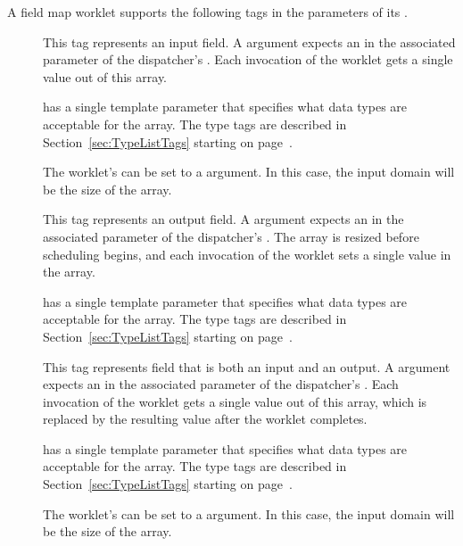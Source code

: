 A field map worklet supports the following tags in the parameters of its
\controlsignature.
\begin{description}
\item[] This tag represents an input field. A
   argument expects an  in the
  associated parameter of the dispatcher's . Each
  invocation of the worklet gets a single value out of this array.

   has a single template parameter that specifies what data
  types are acceptable for the array. The type tags are described in
  Section~\ref{sec:TypeListTags} starting on
  page~\pageref{sec:TypeListTags}.

  The worklet's  can be set to a  argument. In
  this case, the input domain will be the size of the array.

\item[] This tag represents an output field. A
   argument expects an  in the
  associated parameter of the dispatcher's . The array is
  resized before scheduling begins, and each invocation of the worklet sets
  a single value in the array.

   has a single template parameter that specifies what
  data types are acceptable for the array. The type tags are described in
  Section~\ref{sec:TypeListTags} starting on
  page~\pageref{sec:TypeListTags}.

\item[] This tag represents field that is both an input
  and an output. A  argument expects an
   in the associated parameter of the
  dispatcher's . Each invocation of the worklet gets a
  single value out of this array, which is replaced by the resulting value
  after the worklet completes.

   has a single template parameter that specifies what
  data types are acceptable for the array. The type tags are described in
  Section~\ref{sec:TypeListTags} starting on
  page~\pageref{sec:TypeListTags}.

  The worklet's  can be set to a  argument. In
  this case, the input domain will be the size of the array.

  \commoncontrolsignaturetags
\end{description}

